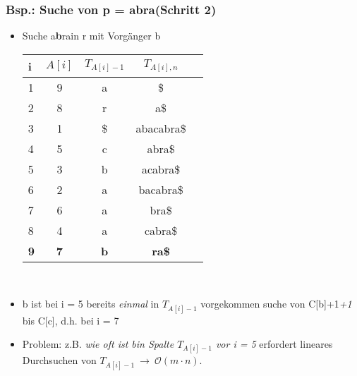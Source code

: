 \documentclass{beamer}
\begin{document}
\begin{frame}
\frametitle{Bsp.: Suche von p = \glqq abra\grqq (Schritt 2)}
\begin{itemize}
\item Suche \glqq a\color{red}\textbf{b}\color{black}ra\grqq in r mit Vorgänger b
\begin{tabular}{l<{\ttfamily}|c<{\ttfamily} c<{\ttfamily}c<{\ttfamily} l<{\ttfamily}}
\textbf{i} & $A[i]$ & $T_{A[i]-1}$ & $T_{A[i],n}$\\\hline
1 & 9 & a & \$ \\
2 & 8 & r & a\$ \\
3 & 1 & \$ & abacabra\$ \\
4 & 5 & c & abra\$ \\
5 & 3 & \color{red}b \color{black}& acabra\$ \\
6 & 2 & a & bacabra\$ \\
7 & 6 & a & bra\$ \\
8 & 4 & a & cabra\$ \\
\textbf{9} & \textbf{7} & \color{red}\textbf{b} & \textbf{ra\$} \\
\end{tabular}\\[5mm]
\item b ist bei i = 5 bereits \textit{einmal} in $T_{A[i]-1}$ vorgekommen \textrightarrow suche von C[\glqq b\grqq]+1\textit{+1} bis C[\glqq c\grqq], d.h. bei i = 7
\item Problem: z.B. \textit{wie oft ist \glqq b\grqq  in Spalte $T_{A[i]-1}$ vor i = 5} erfordert lineares Durchsuchen von $T_{A[i]-1}\ \rightarrow\ \mathcal{O}(m\cdot n)$.
\end{itemize}
\end{frame}

\end{document}
